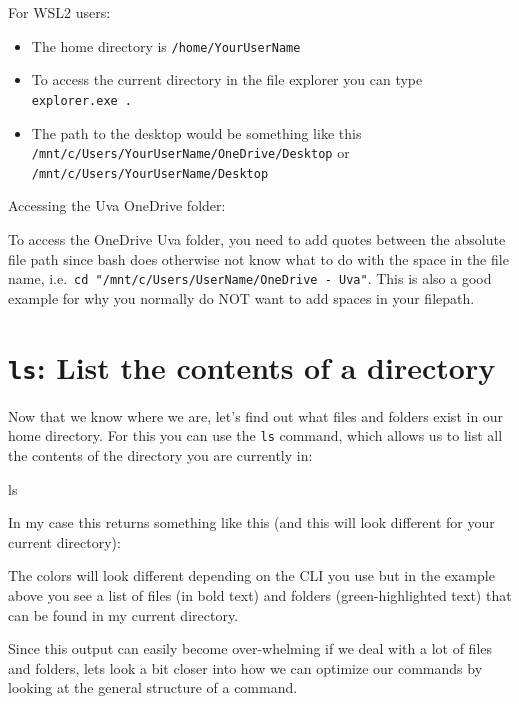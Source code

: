 \documentclass[
  letterpaper,
  DIV=11,
  numbers=noendperiod]{scrreprt}
\newenvironment{Shaded}{}{}
\newcommand{\FunctionTok}[1]{\textcolor[rgb]{0.44,0.26,0.76}{#1}}
\providecommand{\tightlist}{%
  \setlength{\itemsep}{0pt}\setlength{\parskip}{0pt}}\usepackage{longtable,booktabs,array}
\begin{document}
\begin{tcolorbox}
For WSL2 users:

\begin{itemize}
\tightlist
\item
  The home directory is \texttt{/home/YourUserName}
\item
  To access the current directory in the file explorer you can type
  \texttt{explorer.exe\ .}
\item
  The path to the desktop would be something like this
  \texttt{/mnt/c/Users/YourUserName/OneDrive/Desktop} or
  \texttt{/mnt/c/Users/YourUserName/Desktop}
\end{itemize}

Accessing the Uva OneDrive folder:

To access the OneDrive Uva folder, you need to add quotes between the
absolute file path since bash does otherwise not know what to do with
the space in the file name,
i.e.~\texttt{cd\ "/mnt/c/Users/UserName/OneDrive\ -\ Uva"}. This is also
a good example for why you normally do NOT want to add spaces in your
filepath.

\end{tcolorbox}

\section{\texorpdfstring{\texttt{ls}: List the contents of a
directory}{ls: List the contents of a directory}}\label{ls-list-the-contents-of-a-directory}

Now that we know where we are, let's find out what files and folders
exist in our home directory. For this you can use the \texttt{ls}
command, which allows us to list all the contents of the directory you
are currently in:

\begin{Shaded}
\begin{Highlighting}[]
\FunctionTok{ls}
\end{Highlighting}
\end{Shaded}

In my case this returns something like this (and this will look
different for your current directory):

The colors will look different depending on the CLI you use but in the
example above you see a list of files (in bold text) and folders
(green-highlighted text) that can be found in my current directory.

Since this output can easily become over-whelming if we deal with a lot
of files and folders, lets look a bit closer into how we can optimize
our commands by looking at the general structure of a command.
\end{document}
